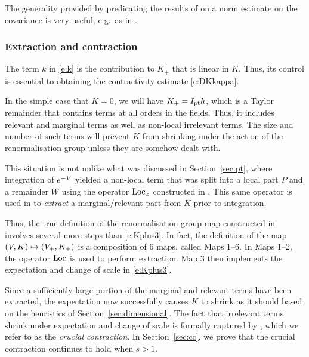 \begin{rk}
The generality provided by predicating the results of \cite{BS-rg-IE} on a
norm estimate on the covariance is very useful, e.g.\ as in \cite{Slad17}.
\end{rk}

\subsubsection{Extraction and contraction}

The term $k$ in \eqref{e:k} is the contribution to $K_+$ that is linear in $K$. Thus, its
control is essential to obtaining the contractivity estimate \eqref{e:DKkappa}.

In the simple case that $K = 0$, we will have $K_+ = I_{\rm pt} h$, which is a Taylor
remainder that contains terms at all orders in the fields. Thus, it includes
relevant and marginal terms as well as non-local irrelevant terms.
The size and number of such terms will prevent $K$ from shrinking under the action
of the renormalisation group unless they are somehow dealt with.

This situation is not unlike what was discussed in Section~\ref{sec:pt}, where
integration of $e^{-V}$ yielded a non-local term that was split into a local
part $P$ and a remainder $W$ using the operator $\operatorname{Loc}_x$ constructed in
\cite{BBS-rg-pt}. This same operator is used in \cite{BS-rg-step} to \emph{extract}
a marginal/relevant part from $K$ prior to integration.

Thus, the true definition of the renormalisation group map constructed in
\cite{BS-rg-step} involves several more steps than \eqref{e:Kplus3}. In fact,
the definition of the map $(V, K) \mapsto (V_+, K_+)$ is a composition of
$6$ maps, called Maps 1--6. In Maps 1--2, the operator $\operatorname{Loc}$ is used to perform
extraction. Map 3 then implements the expectation and change of scale in
\eqref{e:Kplus3}.

Since a sufficiently large portion of the marginal and relevant terms have been
extracted, the expectation now successfully causes $K$ to shrink as it should
based on the heuristics of Section~\ref{sec:dimensional}. The fact that irrelevant
terms shrink under expectation and change of scale is formally captured by
\cite[Proposition~\ref{IE-prop:cl}]{BS-rg-IE}, which we refer to as the
\emph{crucial contraction}. In Section~\ref{sec:cc}, we prove that the
crucial contraction continues to hold when $s > 1$.

